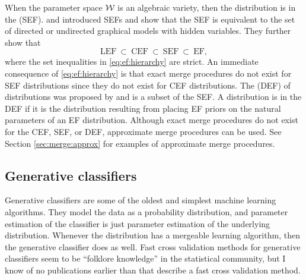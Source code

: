 \documentclass[thesis.tex]{subfiles}
\begin{document}
When the parameter space ${\mathcal W}$ is an algebraic variety,
then the distribution is in the  (SEF).
\cite{geiger1998graphical} and \citet{geiger2001stratified} introduced SEFs and show that the SEF is equivalent to the set of directed or undirected graphical models with hidden variables.
They further show that
\begin{equation}
    \label{eq:ef:hierarchy}
    \text{LEF}~ \subset ~\text{CEF}~ \subset ~\text{SEF}~\subset~\text{EF}
    ,
\end{equation}
where the set inequalities in \eqref{eq:ef:hierarchy} are strict.
An immediate consequence of \eqref{eq:ef:hierarchy} is that exact merge procedures do not exist for SEF distributions since they do not exist for CEF distributions.
The  (DEF) of distributions was proposed by \citet{ranganath2015deep} and is a subset of the SEF.
A distribution is in the DEF if it is the distribution resulting from placing EF priors on the natural parameters of an EF distribution.
Although exact merge procedures do not exist for the CEF, SEF, or DEF,
approximate merge procedures can be used.
See Section \ref{sec:merge:approx} for examples of approximate merge procedures.


\subsection{Generative classifiers}

Generative classifiers are some of the oldest and simplest machine learning algorithms.
They model the data as a probability distribution,
and parameter estimation of the classifier is just parameter estimation of the underlying distribution.
Whenever the distribution has a mergeable learning algorithm,
then the generative classifier does as well.
Fast cross validation methods for generative classifiers seem to be ``folklore knowledge'' in the statistical community,
but I know of no publications earlier than \cite{izbicki2013algebraic} that describe a fast cross validation method.
\end{document}
